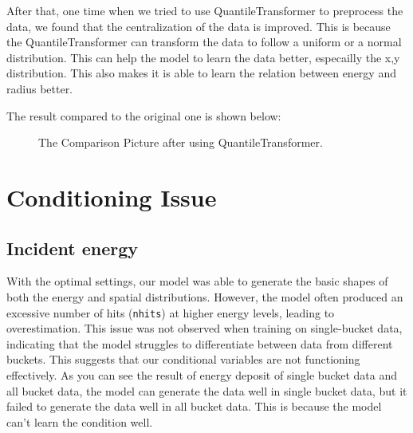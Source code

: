 After that, one time when we tried to use QuantileTransformer to preprocess the data, we found that the centralization of the data is improved. This is because the QuantileTransformer can transform the data to follow a uniform or a normal distribution. This can help the model to learn the data better, especailly the x,y distribution. This also makes it is able to learn the relation between energy and radius better.

The result compared to the original one is shown below:

\begin{figure}[h!]
    \centering
    \caption{The Comparison Picture after using QuantileTransformer.}
\end{figure}

\section{Conditioning Issue}
\subsection{Incident energy}
With the optimal settings, our model was able to generate the basic shapes of both the energy and spatial distributions. However, the model often produced an excessive number of hits (\texttt{nhits}) at higher energy levels, leading to overestimation. This issue was not observed when training on single-bucket data, indicating that the model struggles to differentiate between data from different buckets. This suggests that our conditional variables are not functioning effectively. As you can see the result of energy deposit of single bucket data and all bucket data, the model can generate the data well in single bucket data, but it failed to generate the data well in all bucket data. This is because the model can't learn the condition well.

